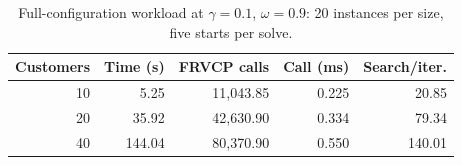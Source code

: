\begin{table}[!t]
\centering
\footnotesize
\caption{Full-configuration workload at $\gamma=0.1$, $\omega=0.9$: 20 instances per size, five starts per solve.}
\label{tab:scalability}
\setlength{\tabcolsep}{3pt}
\renewcommand{\arraystretch}{1.12}
\begin{tabular}{rrrrr}
\toprule
Customers & Time (s) & FRVCP calls & Call (ms) & Search/iter. \\
\midrule
10 & 5.25 & 11,043.85 & 0.225 & 20.85 \\
20 & 35.92 & 42,630.90 & 0.334 & 79.34 \\
40 & 144.04 & 80,370.90 & 0.550 & 140.01 \\
\bottomrule
\end{tabular}
\end{table}
